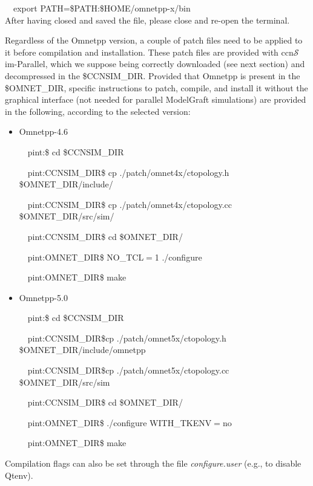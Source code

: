 \documentclass[10pt]{article}
\newcommand{\ccnsim}{ccn\ensuremath{\mathcal{S}}im} %
\newcommand{\textapprox}{\raisebox{0.5ex}{\texttildelow}}
\newcommand{\colorboxg}[1]{{\colorbox{gray!20}{#1}}}
\begin{document}
\ \ \colorboxg{export PATH=\$PATH:\$HOME/omnetpp-x/bin} \\

After having closed and saved the file, please close and re-open the terminal.

\noindent Regardless of the Omnetpp version, a couple of patch files need to be applied to it before compilation and installation. 
These patch files are provided with \ccnsim-Parallel, which we suppose being correctly downloaded (see next section) and decompressed in the \$CCNSIM\_DIR.
Provided that Omnetpp is present in the \$OMNET\_DIR, specific instructions to patch, compile, and install it without the graphical interface (not needed for parallel ModelGraft simulations) are provided in the following, according to the selected version:

\begin{itemize}
     \item Omnetpp-4.6

     \ \ \colorboxg{pint:\textapprox\$ cd \$CCNSIM\_DIR} 

     \ \ \colorboxg{pint:CCNSIM\_DIR\$ cp ./patch/omnet\-4x/ctopology.h \$OMNET\_DIR/include/}

     \ \ \colorboxg{pint:CCNSIM\_DIR\$ cp ./patch/omnet\-4x/ctopology.cc \$OMNET\_DIR/src/sim/}

     \ \ \colorboxg{pint:CCNSIM\_DIR\$ cd \$OMNET\_DIR/}

     \ \ \colorboxg{pint:OMNET\_DIR\$ NO\_TCL$=$1 ./configure}

     \ \ \colorboxg{pint:OMNET\_DIR\$ make}


     \item Omnetpp-5.0

     \ \ \colorboxg{pint:\textapprox\$ cd \$CCNSIM\_DIR}

     \ \ \colorboxg{pint:CCNSIM\_DIR\$cp ./patch/omnet\-5x/ctopology.h \$OMNET\_DIR/include/omnetpp}

     \ \ \colorboxg{pint:CCNSIM\_DIR\$cp ./patch/omnet\-5x/ctopology.cc \$OMNET\_DIR/src/sim}

     \ \ \colorboxg{pint:CCNSIM\_DIR\$ cd \$OMNET\_DIR/}

     \ \ \colorboxg{pint:OMNET\_DIR\$ ./configure WITH\_TKENV$=$no }

     \ \ \colorboxg{pint:OMNET\_DIR\$ make}
\end{itemize}

Compilation flags can also be set through the file \emph{configure.user} (e.g., to disable Qtenv).
\end{document}
